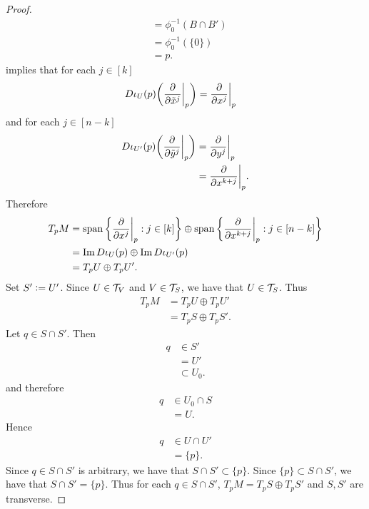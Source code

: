 \documentclass{book}
\begin{document}
\begin{proof}
\begin{align*}
			& = \phi_0^{-1}(B \cap B') \\
			& = \phi_0^{-1}(\{0\}) \\
			& = p.
		\end{align*}
		 implies that for each $j \in [k]$
		\begin{align*}
			D\iota_U(p) \bigg( \frac{\partial}{\partial \tilde{x}^j} \bigg|_p \bigg) 
			& = \frac{\partial}{\partial x^j} \bigg|_p 
		\end{align*}
		and for each $j \in [n-k]$
		\begin{align*}
			D\iota_{U'}(p) \bigg( \frac{\partial}{\partial \tilde{y}^j} \bigg|_p \bigg) 
			& = \frac{\partial}{\partial y^j} \bigg|_p \\
			& = \frac{\partial}{\partial x^{k+j}} \bigg|_p.
		\end{align*}
		Therefore 
		\begin{align*}
			T_pM
			& = \operatorname{span} \bigg \{  \frac{\partial}{\partial x^j} \bigg|_p  : j \in [k] \bigg \} \oplus \operatorname{span} \bigg \{  \frac{\partial}{\partial x^{k+j}} \bigg|_p  : j \in [n-k] \bigg \} \\
			& = \text{Im} \, D \iota_U(p) \oplus \text{Im} \, D \iota_{U'}(p) \\
			& = T_p U \oplus T_p U'.
		\end{align*}
		Set $S' \vcentcolon= U'$. Since $U \in \mathcal{T}_V$ and $V \in \mathcal{T}_S$, we have that $U \in \mathcal{T}_S$. Thus
		\begin{align*}
			T_pM
			& = T_p U \oplus T_p U' \\
			& = T_p S \oplus T_p S'.
		\end{align*} 
		Let $q \in S \cap S'$. Then 
		\begin{align*}
			q 
			& \in S' \\
			& = U' \\
			& \subset U_0.
		\end{align*}
		and therefore
		\begin{align*}
			q 
			& \in U_0 \cap S \\
			& = U.
		\end{align*}
		Hence 
		\begin{align*}
			q 
			& \in U \cap U' \\
			& = \{p\}.
		\end{align*}
		Since $q \in S \cap S'$ is arbitrary, we have that $S \cap S' \subset \{p\}$. Since $\{p\} \subset S \cap S'$, we have that $S \cap S' = \{p\}$.
		Thus for each $q \in S \cap S'$, $T_pM = T_p S \oplus T_p S'$ and $S, S'$ are transverse. 
	\end{proof}
\end{document}
